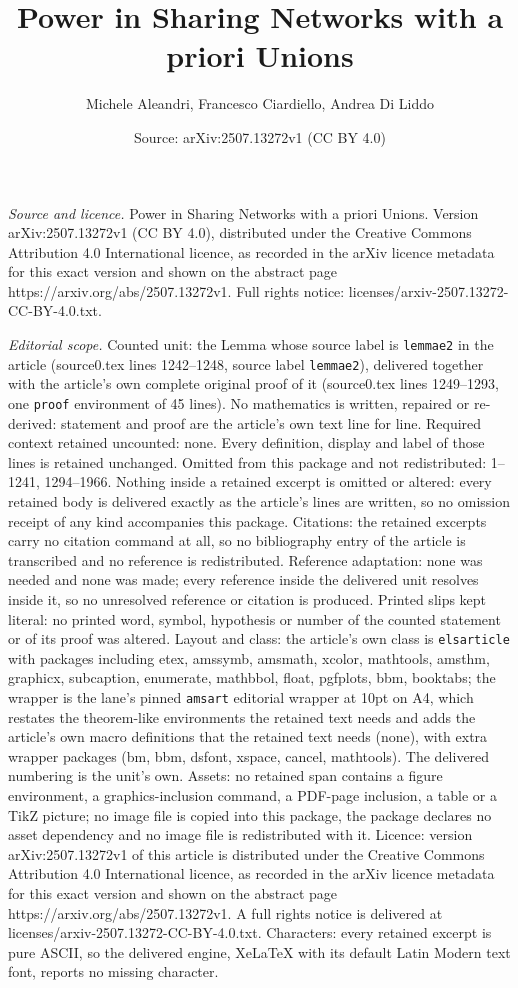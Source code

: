 \documentclass[10pt,a4paper]{amsart}
\title[Power in Sharing Networks with a priori Unions]{Power in Sharing Networks with a priori Unions}
\author{Michele Aleandri, Francesco Ciardiello, Andrea Di Liddo}
\date{Source: arXiv:2507.13272v1 (CC BY 4.0)}
\begin{document}
\maketitle

\noindent\emph{Source and licence.} Power in Sharing Networks with a priori Unions. Version arXiv:2507.13272v1 (CC BY 4.0), distributed under the Creative Commons Attribution 4.0 International licence, as recorded in the arXiv licence metadata for this exact version and shown on the abstract page https://arxiv.org/abs/2507.13272v1. Full rights notice: licenses/arxiv-2507.13272-CC-BY-4.0.txt.\par\smallskip

\noindent\textit{Editorial scope.} Counted unit: the Lemma whose source label is \texttt{lemmae2} in the article (source0.tex lines 1242--1248, source label \texttt{lemmae2}), delivered together with the article's own complete original proof of it (source0.tex lines 1249--1293, one \texttt{proof} environment of 45 lines). No mathematics is written, repaired or re-derived: statement and proof are the article's own text line for line. Required context retained uncounted: none. Every definition, display and label of those lines is retained unchanged. Omitted from this package and not redistributed: 1--1241, 1294--1966. Nothing inside a retained excerpt is omitted or altered: every retained body is delivered exactly as the article's lines are written, so no omission receipt of any kind accompanies this package. Citations: the retained excerpts carry no citation command at all, so no bibliography entry of the article is transcribed and no reference is redistributed. Reference adaptation: none was needed and none was made; every reference inside the delivered unit resolves inside it, so no unresolved reference or citation is produced. Printed slips kept literal: no printed word, symbol, hypothesis or number of the counted statement or of its proof was altered. Layout and class: the article's own class is \texttt{elsarticle} with packages including etex, amssymb, amsmath, xcolor, mathtools, amsthm, graphicx, subcaption, enumerate, mathbbol, float, pgfplots, bbm, booktabs; the wrapper is the lane's pinned \texttt{amsart} editorial wrapper at 10pt on A4, which restates the theorem-like environments the retained text needs and adds the article's own macro definitions that the retained text needs (none), with extra wrapper packages (bm, bbm, dsfont, xspace, cancel, mathtools). The delivered numbering is the unit's own. Assets: no retained span contains a figure environment, a graphics-inclusion command, a PDF-page inclusion, a table or a TikZ picture; no image file is copied into this package, the package declares no asset dependency and no image file is redistributed with it. Licence: version arXiv:2507.13272v1 of this article is distributed under the Creative Commons Attribution 4.0 International licence, as recorded in the arXiv licence metadata for this exact version and shown on the abstract page https://arxiv.org/abs/2507.13272v1. A full rights notice is delivered at licenses/arxiv-2507.13272-CC-BY-4.0.txt. Characters: every retained excerpt is pure ASCII, so the delivered engine, XeLaTeX with its default Latin Modern text font, reports no missing character.
\end{document}

